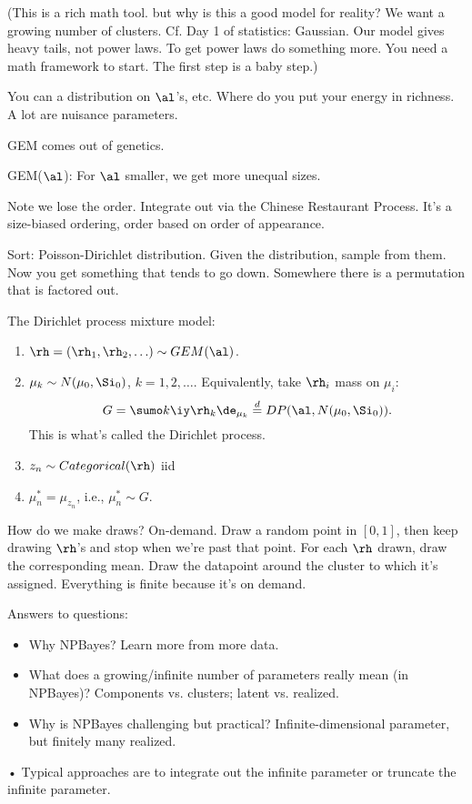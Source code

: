 (This is a rich math tool. %
but why is this a good model for reality? We want a growing number of clusters. Cf. Day 1 of statistics: Gaussian. Our model gives heavy tails, not power laws. To get power laws do something more. You need a math framework to start. The first step is a baby step.)

You can a distribution on $\al$'s, etc. Where do you put your energy in richness. A  lot are nuisance parameters. 

GEM comes out of genetics. 

GEM($\al$): For $\al$ smaller, we get more unequal sizes.

Note we lose the order. Integrate out via the Chinese Restaurant Process. It's a size-biased ordering, order based on order of appearance.

Sort: Poisson-Dirichlet distribution. Given the distribution, sample from them. Now you get something that tends to go down. Somewhere there is a permutation that is factored out.

The Dirichlet process mixture model:
\begin{enumerate}
\item
$\rh=(\rh_1,\rh_2,\ldots)\sim GEM(\al)$.
\item
$\mu_k \sim N(\mu_0,\Si_0)$, $k=1,2,\ldots$.
Equivalently, take $\rh_i$ mass on $\mu_i$:
$$
G=\sumo k{\iy} \rh_k \de_{\mu_k} \stackrel d= DP(\al, N(\mu_0,\Si_0)).
$$
This is what's called the Dirichlet process.
\item
$z_n \sim Categorical(\rh)$ iid
\item
$\mu_n^* = \mu_{z_n}$, i.e., $\mu_n^*\sim G$.
\end{enumerate}

How do we make draws? On-demand. Draw a random point in $[0,1]$, then keep drawing $\rh$'s and stop when we're past that point. For each $\rh$ drawn, draw the corresponding mean. Draw the datapoint around the cluster to which it's assigned. Everything is finite because it's on demand.

Answers to questions:

\begin{itemize}
\item
Why NPBayes? Learn more from more data.
\item
What does a growing/infinite number of parameters really mean (in NPBayes)?
Components vs. clusters; latent vs. realized.
\item
Why is NPBayes challenging but practical?
Infinite-dimensional parameter, but finitely many realized.
\end{itemize}•
Typical approaches are to integrate out the infinite parameter or truncate the infinite parameter.

